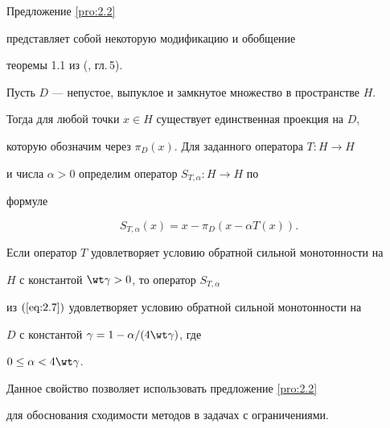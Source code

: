 \begin{note}


Предложение \ref{pro:2.2}


представляет собой некоторую модификацию и обобщение 


теоремы 1.1 из (\cite{GT89}, гл.\,5). 


\end{note}





Пусть $D$ --- непустое, выпуклое и замкнутое множество в пространстве $H$.


Тогда для любой точки $x \in H$ существует единственная проекция на $D$, 


которую обозначим через $\pi_D(x)$. Для заданного оператора $T:H\rightarrow H$ 


и числа $\alpha > 0$ определим оператор $S_{T,\alpha}: H \rightarrow H$ по


формуле


\begin{equation} \label{eq:2.7} 


S_{T,\alpha} (x)=x - \pi_{D}(x - \alpha T(x)).


\end{equation}


 


\begin{lem}


\label{lm:2.2}


Если оператор $T$ удовлетворяет условию обратной сильной монотонности на 


$H$ с константой $\wt \gamma > 0$, то оператор $S_{T,\alpha}$ 


из $(\ref{eq:2.7})$ удовлетворяет условию обратной сильной монотонности на 


$D$ с константой $\gamma=1 - \alpha / (4\wt \gamma )$, где


$0 \leq \alpha < 4\wt \gamma $.


\end{lem}





Данное свойство позволяет использовать предложение \ref{pro:2.2}


для обоснования сходимости методов в задачах с ограничениями.






